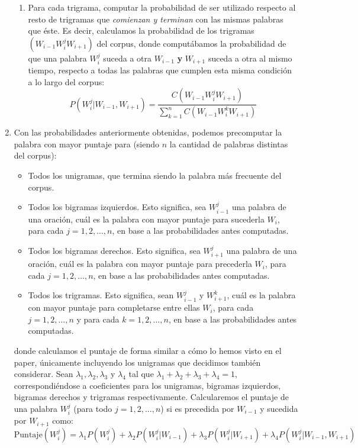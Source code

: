 \documentclass[a4paper]{article}
\begin{document}
\begin{enumerate}
\begin{enumerate}
        \item Para cada trigrama, computar la probabilidad de ser utilizado respecto al resto de trigramas que \textit{comienzan y terminan} con las mismas palabras que éste. Es decir, calculamos la probabilidad de los trigramas $(W_{i-1} W_i^j W_{i+1})$ del corpus, donde computábamos la probabilidad de que una palabra $W_i^j$ suceda a otra $W_{i-1}$ \textbf{y} $W_{i+1}$ suceda a otra al mismo tiempo, respecto a todas las palabras que cumplen esta misma condición a lo largo del corpus:
            \[
                P(W_i^j|W_{i-1},W_{i+1}) = \frac{C(W_{i-1} W_i^j W_{i+1})}{\sum_{k=1}^n C(W_{i-1} W_i^k W_{i+1})}
            \]
        \end{enumerate}

    \item Con las probabilidades anteriormente obtenidas, podemos precomputar la palabra con mayor puntaje para (siendo $n$ la cantidad de palabras distintas del corpus):
        \begin{itemize}
            \item Todos los unigramas, que termina siendo la palabra más frecuente del corpus.
            \item Todos los bigramas izquierdos. Esto significa, sea $W_{i-1}^j$ una palabra de una oración, cuál es la palabra con mayor puntaje para sucederla $W_i$, para cada $j = 1,2,\dots,n$, en base a las probabilidades antes computadas.
            \item Todos los bigramas derechos. Esto significa, sea $W_{i+1}^j$ una palabra de una oración, cuál es la palabra con mayor puntaje para precederla $W_i$, para cada $j = 1,2,\dots,n$, en base a las probabilidades antes computadas.
            \item Todos los trigramas. Esto significa, sean $W_{i-1}^j$ y $W_{i+1}^k$, cuál es la palabra con mayor puntaje para completarse entre ellas $W_i$, para cada $j = 1,2,\dots,n$ y para cada $k =1,2,\dots,n$, en base a las probabilidades antes computadas.
        \end{itemize}

        donde calculamos el puntaje de forma similar a cómo lo hemos visto en el paper, únicamente incluyendo los unigramas que decidimos también considerar. Sean $\lambda_1, \lambda_2, \lambda_3$ y $\lambda_4$ tal que $\lambda_1 + \lambda_2 + \lambda_3 + \lambda_4 = 1$, correspondiéndose a coeficientes para los unigramas, bigramas izquierdos, bigramas derechos y trigramas respectivamente. Calcularemos el puntaje de una palabra $W_i^j$ (para todo $j=1,2,\dots,n$) si es precedida por $W_{i-1}$ y sucedida por $W_{i+1}$ como:
        \[
            \text{Puntaje}(W_i^j) = \lambda_1 P(W^j_i) + \lambda_2 P(W^j_i|W_{i-1}) + \lambda_3 P(W^j_i|W_{i+1}) + \lambda_4 P(W^j_i|W_{i-1},W_{i+1})
        \]


\end{enumerate}
\end{document}
